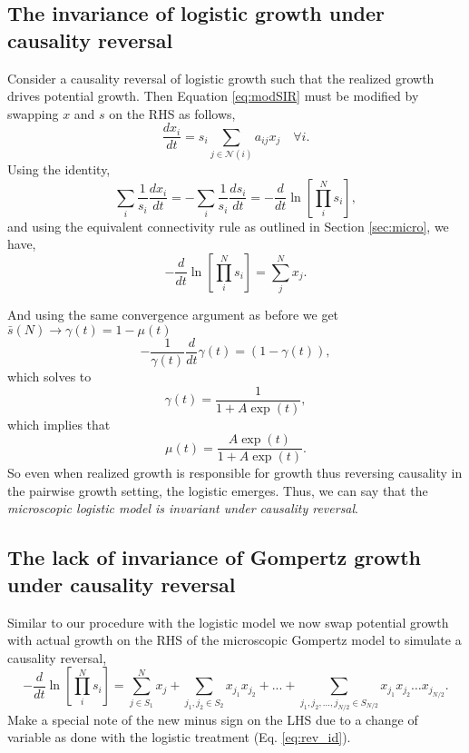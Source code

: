 \documentclass{article}
\begin{document}
\subsection{The invariance of logistic growth under causality reversal}
\label{appendix:swappinglogistic}
Consider a causality reversal of logistic growth such that the realized growth drives potential growth. Then Equation \ref{eq:modSIR} must be modified by swapping $x$ and $s$ on the RHS as follows,
\begin{equation}
\label{eq:revSIR}
\frac{d x_i}{dt} = s_i\sum_{j \in \mathcal{N}(i)}{a_{ij}}x_{j} \quad \forall i.
\end{equation}
Using the identity,
\begin{equation}
\label{eq:modSIR2}
\sum_i\frac{1}{s_i}\frac{dx_i}{dt} = -\sum_i\frac{1}{s_i}\frac{ds_i}{dt} = -\frac{d}{dt} \ln \left[ \prod_i^N s_i \right ],
\end{equation}
and using the equivalent connectivity rule as outlined in Section \ref{sec:micro}, we have,
\begin{equation}
\label{eq:rev_id}
-\frac{d}{dt} \ln \left[ \prod_i^N s_i \right ] = \sum_j^N x_j.
\end{equation}

And using the same convergence argument as before we get $\bar{s}(N) \rightarrow \gamma(t) = 1 - \mu(t)$
\begin{equation}
  -\frac{1}{\gamma(t)}\frac{d}{dt}\gamma(t) = (1-\gamma(t)),
\end{equation}
which solves to 
\begin{equation}
  \gamma(t) = \frac{1}{1 + A \exp(t)},
\end{equation}
which implies that
\begin{equation}
  \mu(t) = \frac{A \exp(t)}{1 + A \exp(t)}.
\end{equation}
So even when realized growth is responsible for growth thus reversing causality in the pairwise growth setting, the logistic emerges. Thus, we can say that the \textit{microscopic logistic model is invariant under causality reversal}.

\subsection{The lack of invariance of Gompertz growth under causality reversal}
\label{appendix:swappinggompertz}
Similar to our procedure with the logistic model we now swap potential growth with actual growth on the RHS of the microscopic Gompertz model to simulate a causality reversal,
\begin{equation}
\label{eq:MicroGompRev}
-\frac{d}{dt} \ln \left[ \prod_i^N s_i \right ] = \sum_{j\in S_1}^N x_{j} + \sum_{j_1, j_2 \in S_2} x_{j_1}x_{j_2} + ... + \sum_{j_1, j_2, ..., j_{N/2} \in S_{N/2}} x_{j_1}x_{j_2}\dots x_{j_{N/2}}.
\end{equation}
Make a special note of the new minus sign on the LHS due to a change of variable as done with the logistic treatment (Eq. \ref{eq:rev_id}).
\end{document}
